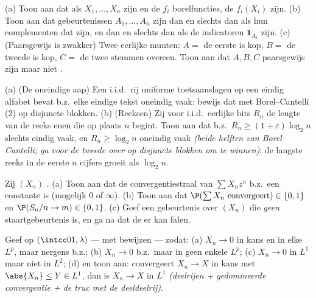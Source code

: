 \begin{exercise}[$\star\star$]\label{exo:b3:probability:3}
(a) Toon aan dat als $X_1, \dots, X_n$  zijn en de
$f_i$ borelfuncties, de $f_i(X_i)$  zijn.
(b) Toon aan dat gebeurtenissen $A_1, \dots, A_n$ 
zijn dan en slechts dan als hun complementen dat zijn, en dan en
slechts dan als de indicatoren $\mathbf 1_{A_i}$ 
 zijn.
(c) (Paarsgewijs is zwakker) Twee eerlijke munten: $A = $ de
eerste is kop, $B = $ de tweede is kop, $C = $ de twee stemmen
overeen. Toon aan dat $A, B, C$ paarsgewijs  zijn
maar niet .
\end{exercise}

\begin{exercise}[$\star\star$]\label{exo:b3:probability:4}
(a) (De oneindige aap) Een i.i.d.\ rij uniforme toetsaanslagen op
een eindig alfabet bevat b.z.\ elke eindige tekst oneindig vaak:
bewijs dat met Borel--Cantelli (2) op disjuncte blokken.
(b) (Reeksen) Zij voor i.i.d.\ eerlijke bits $R_n$ de lengte van
de reeks enen die op plaats $n$ begint. Toon aan dat b.z.\ $R_n
\geq (1+\varepsilon)\log_2n$ slechts eindig vaak, en $R_n \geq
\log_2 n$ oneindig vaak \emph{(beide helften van
Borel--Cantelli; ga voor de tweede over op disjuncte blokken om
 te winnen)}: de langste reeks in de eerste $n$
cijfers groeit als $\log_2n$.
\end{exercise}

\begin{exercise}[$\star\star$]\label{exo:b3:probability:5}
Zij $(X_n)$ .
(a) Toon aan dat de convergentiestraal van $\sum X_n z^n$ b.z.\
een constante is (mogelijk $0$ of $\infty$).
(b) Toon aan dat $\P(\sum X_n \text{ convergeert}) \in \{0, 1\}$
en $\P(S_n/n \to m) \in \{0,1\}$.
(c) Geef een gebeurtenis over $(X_n)$ die \emph{geen}
staartgebeurtenis is, en ga na dat de  er kan falen.
\end{exercise}

\begin{exercise}[$\star\star$]\label{exo:b3:probability:6}
Geef op $(\intcc01, \lambda)$ --- met bewijzen ---
 zodat:
(a) $X_n \to 0$ in kans en in elke $L^p$, maar nergens b.z.;
(b) $X_n \to 0$ b.z.\ maar in geen enkele $L^p$;
(c) $X_n \to 0$ in $L^1$ maar niet in $L^2$;
(d) en toon aan: convergeert $X_n \to X$ in kans met $\abs{X_n}
\leq Y \in L^1$, dan is $X_n \to X$ in $L^1$ \emph{(deelrijen +
gedomineerde convergentie + de truc met de deeldeelrij)}.
\end{exercise}


